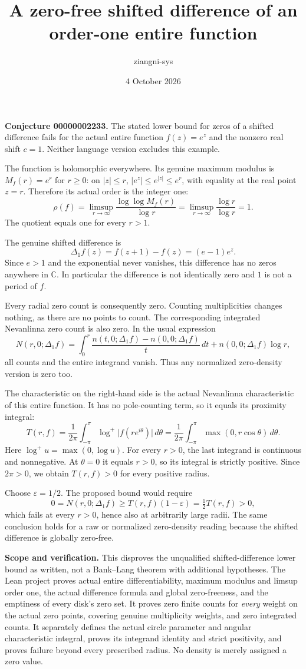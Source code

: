 \documentclass[11pt]{article}
\title{A zero-free shifted difference of an order-one entire function}
\author{ziangni-sys}
\date{4 October 2026}
\begin{document}
\maketitle
\noindent\textbf{Conjecture 00000002233.} The stated lower bound for zeros of a shifted difference fails for the actual entire function $f(z)=e^z$ and the nonzero real shift $c=1$. Neither language version excludes this example.

The function is holomorphic everywhere. Its genuine maximum modulus is $M_f(r)=e^r$ for $r\geq0$: on $|z|\leq r$, $|e^z|\leq e^{|z|}\leq e^r$, with equality at the real point $z=r$. Therefore its actual order is the integer one:
\[
 \rho(f)=\limsup_{r\to\infty}\frac{\log\log M_f(r)}{\log r}
 =\limsup_{r\to\infty}\frac{\log r}{\log r}=1.
\]
The quotient equals one for every $r>1$.

The genuine shifted difference is
\[
 \Delta_1 f(z)=f(z+1)-f(z)=(e-1)e^z.
\]
Since $e>1$ and the exponential never vanishes, this difference has no zeros anywhere in $\mathbb C$. In particular the difference is not identically zero and $1$ is not a period of $f$.

Every radial zero count is consequently zero. Counting multiplicities changes nothing, as there are no points to count. The corresponding integrated Nevanlinna zero count is also zero. In the usual expression
\[
 N(r,0;\Delta_1 f)=\int_0^r \frac{n(t,0;\Delta_1 f)-n(0,0;\Delta_1 f)}{t}\,dt
 +n(0,0;\Delta_1 f)\log r,
\]
all counts and the entire integrand vanish. Thus any normalized zero-density version is zero too.

The characteristic on the right-hand side is the actual Nevanlinna characteristic of this entire function. It has no pole-counting term, so it equals its proximity integral:
\[
 T(r,f)=\frac{1}{2\pi}\int_{-\pi}^{\pi}
 \log^+\bigl|f(re^{i\theta})\bigr|\,d\theta
 =\frac{1}{2\pi}\int_{-\pi}^{\pi}\max(0,r\cos\theta)\,d\theta.
\]
Here $\log^+ u=\max(0,\log u)$. For every $r>0$, the last integrand is continuous and nonnegative. At $\theta=0$ it equals $r>0$, so its integral is strictly positive. Since $2\pi>0$, we obtain $T(r,f)>0$ for every positive radius.

Choose $\varepsilon=1/2$. The proposed bound would require
\[
 0=N(r,0;\Delta_1 f)\geq T(r,f)(1-\varepsilon)
 =\tfrac12 T(r,f)>0,
\]
which fails at every $r>0$, hence also at arbitrarily large radii. The same conclusion holds for a raw or normalized zero-density reading because the shifted difference is globally zero-free.

\noindent\textbf{Scope and verification.} This disproves the unqualified shifted-difference lower bound as written, not a Bank--Lang theorem with additional hypotheses. The Lean project proves actual entire differentiability, maximum modulus and limsup order one, the actual difference formula and global zero-freeness, and the emptiness of every disk's zero set. It proves zero finite counts for \emph{every} weight on the actual zero points, covering genuine multiplicity weights, and zero integrated counts. It separately defines the actual circle parameter and angular characteristic integral, proves its integrand identity and strict positivity, and proves failure beyond every prescribed radius. No density is merely assigned a zero value.
\end{document}
